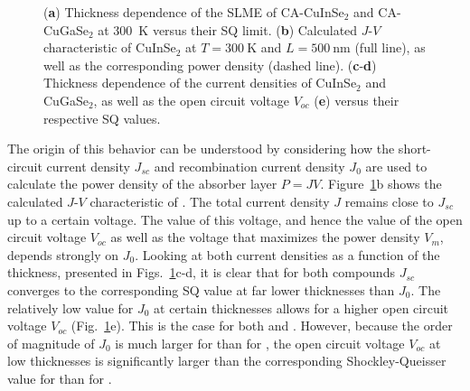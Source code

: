 \begin{refsection}
\begin{figure}[ht]
\captionsetup{width=0.9\textwidth}
\centering

\caption{(\textsf{\textbf{a}}) Thickness dependence of the SLME of CA-CuInSe$_2$ and CA-CuGaSe$_2$ at 300~\si{\kelvin} versus their SQ limit. (\textsf{\textbf{b}}) Calculated $J$-$V$ characteristic of CuInSe$_2$ at $T=300~\si{\kelvin}$ and $L = 500~\si{\nano\meter}$ (full line), as well as the corresponding power density (dashed line). (\textsf{\textbf{c}}-\textsf{\textbf{d}}) Thickness dependence of the current densities of CuInSe$_2$ and CuGaSe$_2$, as well as the open circuit voltage $V_{oc}$ (\textsf{\textbf{e}}) versus their respective SQ values.}
\label{slme:fig-thickness_analysis}
\end{figure}

The origin of this behavior can be understood by considering how the 
short-circuit current density $J_{sc}$ and recombination current density 
$J_0$ are used to calculate the power density of the absorber layer $P = JV$. 
Figure~\ref{slme:fig-thickness_analysis}b shows the calculated \mbox{$J$-$V$} 
characteristic of . The total current 
density $J$ remains close to $J_{sc}$ up to a certain voltage. The value of 
this voltage, and hence the value of the open circuit voltage $V_{oc}$ as well as the 
voltage that maximizes the power density $V_{m}$, depends strongly on $J_0$. 
Looking at both current densities as a function of the thickness, presented in 
Figs.~\ref{slme:fig-thickness_analysis}c-d, it is clear that for both compounds $J_{sc}$ 
converges to the corresponding SQ value at far lower thicknesses than $J_0$. The 
relatively low value for $J_0$ at certain thicknesses allows for a higher open 
circuit voltage $V_{oc}$ (Fig.~\ref{slme:fig-thickness_analysis}e). This is the case for both  and 
. However, because the order of magnitude of $J_0$ is much 
larger for  than for , the open circuit voltage $V_{oc}$ at low thicknesses is significantly larger than the corresponding Shockley-Queisser value for  than for .


\end{refsection}
